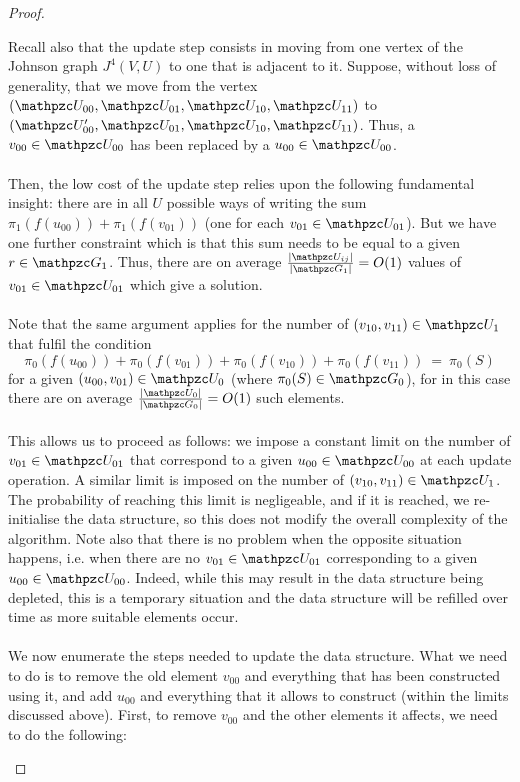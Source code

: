 \begin{proof}
\begin{enumerate}
Recall also that the update step consists in moving from one vertex of the Johnson graph $J^4(V,U)$ to one that is adjacent to it. Suppose, without loss of generality, that we move from the vertex $(\zU_{00},\zU_{01},\zU_{10},\zU_{11})$ to $(\zU_{00}',\zU_{01},\zU_{10},\zU_{11})$. Thus, a $v_{00} \in \zU_{00}$ has been replaced by a $u_{00} \in \zU_{00}$.\\ \\
Then, the low cost of the update step relies upon the following fundamental insight: there are in all $U$ possible ways of writing the sum $\pi_1(f(u_{00})) +\pi_1(f(v_{01}))$ (one for each $v_{01} \in \zU_{01}$). But we have one further constraint which is that this sum needs to be equal to a given $r \in \zG_1$. Thus, there are on average $\frac{|\zU_{ij}|}{|\zG_1|} = O(1)$ values of $v_{01} \in \zU_{01}$ which give a solution.\\ \\
Note that the same argument applies for the number of $(v_{10}, v_{11}) \in \zU_{1}$ that fulfil the condition
$$\pi_0(f(u_{00})) + \pi_0(f(v_{01})) + \pi_0(f(v_{10})) + \pi_0(f(v_{11})) ~ = ~\pi_0(S)$$
for a given 
$(u_{00}, v_{01}) \in \zU_{0}$
(where $\pi_0(S) \in \zG_0$), 
for in this case there are on average 
$\frac{|\zU_{0}|}{|\zG_0|} = O(1)$ 
such elements.\\ \\
This allows us to proceed as follows: we impose a constant limit on the number of $v_{01} \in \zU_{01}$ that correspond to a given $u_{00} \in \zU_{00}$ at each update operation. A similar limit is imposed on the number of $(v_{10}, v_{11}) \in \zU_{1}$. The probability of reaching this limit is negligeable, and if it is reached, we re-initialise the data structure, so this does not modify the overall complexity of the algorithm. Note also that there is no problem when the opposite situation happens, i.e. when there are no $v_{01} \in \zU_{01}$ corresponding to a given $u_{00} \in \zU_{00}$. Indeed, while this may result in the data structure being depleted, this is a temporary situation and the data structure will be refilled over time as more suitable elements occur.\\ \\
We now enumerate the steps needed to update the data structure. What we need to do is to remove the old element $v_{00}$ and everything that has been constructed using it, and add $u_{00}$ and everything that it allows to construct (within the limits discussed above).
First, to remove $v_{00}$ and the other elements it affects, we need to do the following:

\end{enumerate}
\end{proof}
